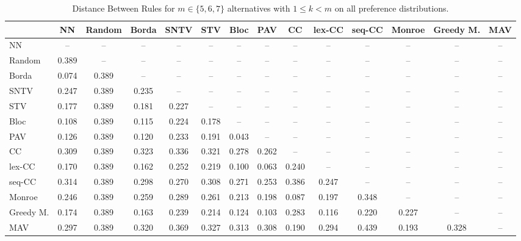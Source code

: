 
\begin{table*}
\centering
\begin{tabular}{lccccccccccccc}
\toprule
 & NN & Random & Borda & SNTV & STV & Bloc & PAV & CC & lex-CC & seq-CC & Monroe & Greedy M. & MAV \\
\midrule
NN & -- & -- & -- & -- & -- & -- & -- & -- & -- & -- & -- & -- & -- \\
Random & 0.389 & -- & -- & -- & -- & -- & -- & -- & -- & -- & -- & -- & -- \\
Borda & 0.074 & 0.389 & -- & -- & -- & -- & -- & -- & -- & -- & -- & -- & -- \\
SNTV & 0.247 & 0.389 & 0.235 & -- & -- & -- & -- & -- & -- & -- & -- & -- & -- \\
STV & 0.177 & 0.389 & 0.181 & 0.227 & -- & -- & -- & -- & -- & -- & -- & -- & -- \\
Bloc & 0.108 & 0.389 & 0.115 & 0.224 & 0.178 & -- & -- & -- & -- & -- & -- & -- & -- \\
PAV & 0.126 & 0.389 & 0.120 & 0.233 & 0.191 & 0.043 & -- & -- & -- & -- & -- & -- & -- \\
CC & 0.309 & 0.389 & 0.323 & 0.336 & 0.321 & 0.278 & 0.262 & -- & -- & -- & -- & -- & -- \\
lex-CC & 0.170 & 0.389 & 0.162 & 0.252 & 0.219 & 0.100 & 0.063 & 0.240 & -- & -- & -- & -- & -- \\
seq-CC & 0.314 & 0.389 & 0.298 & 0.270 & 0.308 & 0.271 & 0.253 & 0.386 & 0.247 & -- & -- & -- & -- \\
Monroe & 0.246 & 0.389 & 0.259 & 0.289 & 0.261 & 0.213 & 0.198 & 0.087 & 0.197 & 0.348 & -- & -- & -- \\
Greedy M. & 0.174 & 0.389 & 0.163 & 0.239 & 0.214 & 0.124 & 0.103 & 0.283 & 0.116 & 0.220 & 0.227 & -- & -- \\
MAV & 0.297 & 0.389 & 0.320 & 0.369 & 0.327 & 0.313 & 0.308 & 0.190 & 0.294 & 0.439 & 0.193 & 0.328 & -- \\
\bottomrule
\end{tabular}

\caption{Distance Between Rules for $m \in \{5, 6, 7\}$ alternatives with $1 \leq k < m$ on all preference distributions.}
\end{table*}
